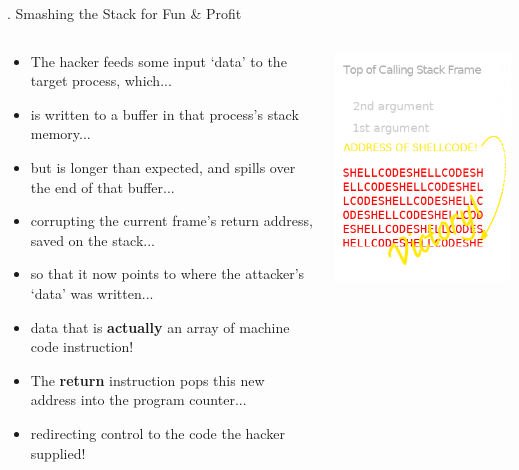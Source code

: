 \documentclass[9pt]{beamer}
\begin{document}
\begin{frame}{\theframenumber. Smashing the Stack for Fun \& Profit}
  \begin{columns}
    \begin{column}{.5\textwidth}
      \small
      \begin{itemize}
      \item The hacker feeds some input `data' to the target process, which...
      \item is written to a buffer in that process's stack memory...
      \item but is longer than expected, and spills over the end of that buffer...
      \item corrupting the current frame's return address, saved on the stack...
      \item so that it now points to where the attacker's `data' was written...
      \item data that is \textbf{actually} an array of machine code instruction!
      \item The \textbf{return} instruction pops this new address into the program counter...
      \item redirecting control to the code the hacker supplied!
      \end{itemize}
    \end{column}
    \begin{column}{.5\textwidth}
      \includegraphics[width=\textwidth]{../images/stack_frame_attack.png}

\end{column}
\end{columns}
\end{frame}
\end{document}
